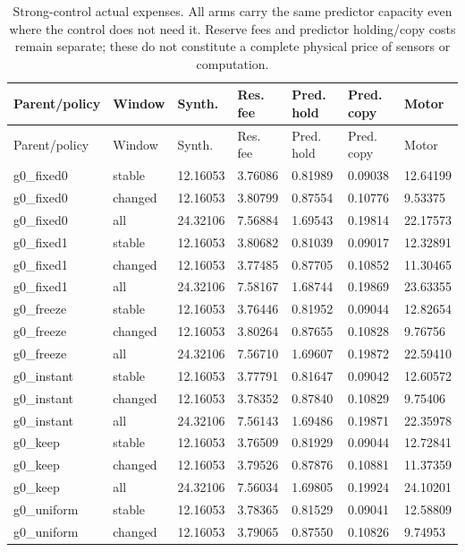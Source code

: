 \begin{longtable}{lllllll}
\caption{Strong-control actual expenses. All arms carry the same predictor capacity even where the control does not need it. Reserve fees and predictor holding/copy costs remain separate; these do not constitute a complete physical price of sensors or computation.}\label{tab:maintenance-costs}\\
\toprule
Parent/policy & Window & Synth. & Res. fee & Pred. hold & Pred. copy & Motor \\
\midrule
\endfirsthead
\toprule
Parent/policy & Window & Synth. & Res. fee & Pred. hold & Pred. copy & Motor \\
\midrule
\endhead
g0\_fixed0 & stable & 12.16053 & 3.76086 & 0.81989 & 0.09038 & 12.64199 \\
g0\_fixed0 & changed & 12.16053 & 3.80799 & 0.87554 & 0.10776 & 9.53375 \\
g0\_fixed0 & all & 24.32106 & 7.56884 & 1.69543 & 0.19814 & 22.17573 \\
g0\_fixed1 & stable & 12.16053 & 3.80682 & 0.81039 & 0.09017 & 12.32891 \\
g0\_fixed1 & changed & 12.16053 & 3.77485 & 0.87705 & 0.10852 & 11.30465 \\
g0\_fixed1 & all & 24.32106 & 7.58167 & 1.68744 & 0.19869 & 23.63355 \\
g0\_freeze & stable & 12.16053 & 3.76446 & 0.81952 & 0.09044 & 12.82654 \\
g0\_freeze & changed & 12.16053 & 3.80264 & 0.87655 & 0.10828 & 9.76756 \\
g0\_freeze & all & 24.32106 & 7.56710 & 1.69607 & 0.19872 & 22.59410 \\
g0\_instant & stable & 12.16053 & 3.77791 & 0.81647 & 0.09042 & 12.60572 \\
g0\_instant & changed & 12.16053 & 3.78352 & 0.87840 & 0.10829 & 9.75406 \\
g0\_instant & all & 24.32106 & 7.56143 & 1.69486 & 0.19871 & 22.35978 \\
g0\_keep & stable & 12.16053 & 3.76509 & 0.81929 & 0.09044 & 12.72841 \\
g0\_keep & changed & 12.16053 & 3.79526 & 0.87876 & 0.10881 & 11.37359 \\
g0\_keep & all & 24.32106 & 7.56034 & 1.69805 & 0.19924 & 24.10201 \\
g0\_uniform & stable & 12.16053 & 3.78365 & 0.81529 & 0.09041 & 12.58809 \\
g0\_uniform & changed & 12.16053 & 3.79065 & 0.87550 & 0.10826 & 9.74953 \\

\end{longtable}

